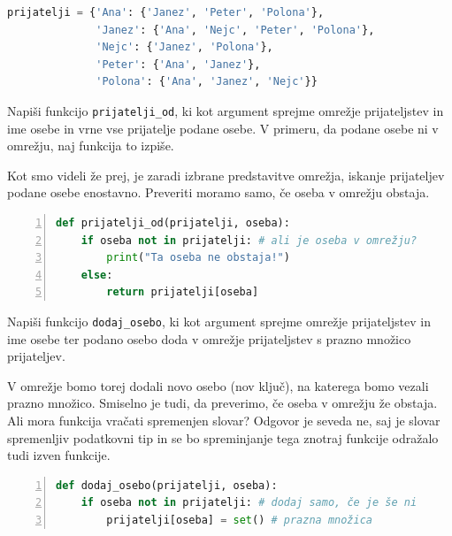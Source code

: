 \begin{resitev}
\begin{lstlisting}[language=Python, showstringspaces=false]
prijatelji = {'Ana': {'Janez', 'Peter', 'Polona'},
              'Janez': {'Ana', 'Nejc', 'Peter', 'Polona'},
              'Nejc': {'Janez', 'Polona'},
              'Peter': {'Ana', 'Janez'},
              'Polona': {'Ana', 'Janez', 'Nejc'}}
\end{lstlisting}
\end{resitev}

\begin{zgled}
Napiši funkcijo \texttt{prijatelji\_od}, ki kot argument sprejme omrežje prijateljstev in ime osebe in vrne vse prijatelje podane osebe. V primeru, da podane osebe ni v omrežju, naj funkcija to izpiše.
\end{zgled}
\begin{resitev}
Kot smo videli že prej, je zaradi izbrane predstavitve omrežja, iskanje prijateljev podane osebe enostavno. Preveriti moramo samo, če oseba v omrežju obstaja.
\begin{lstlisting}[language=Python, showstringspaces=false,numbers=left]
def prijatelji_od(prijatelji, oseba):
    if oseba not in prijatelji: # ali je oseba v omrežju?
        print("Ta oseba ne obstaja!")
    else:
        return prijatelji[oseba]
\end{lstlisting}
\end{resitev}

\begin{zgled}
Napiši funkcijo \texttt{dodaj\_osebo}, ki kot argument sprejme omrežje prijateljstev in ime osebe ter podano osebo doda v omrežje prijateljstev s prazno množico prijateljev.
\end{zgled}
\begin{resitev}
V omrežje bomo torej dodali novo osebo (nov ključ), na katerega bomo vezali prazno množico. Smiselno je tudi, da preverimo, če oseba v omrežju že obstaja. Ali mora funkcija vračati spremenjen slovar? Odgovor je seveda ne, saj je slovar spremenljiv podatkovni tip in se bo spreminjanje tega znotraj funkcije odražalo tudi izven funkcije.
\begin{lstlisting}[language=Python, showstringspaces=false,numbers=left]
def dodaj_osebo(prijatelji, oseba):
    if oseba not in prijatelji: # dodaj samo, če je še ni
        prijatelji[oseba] = set() # prazna množica
\end{lstlisting}
\end{resitev}

